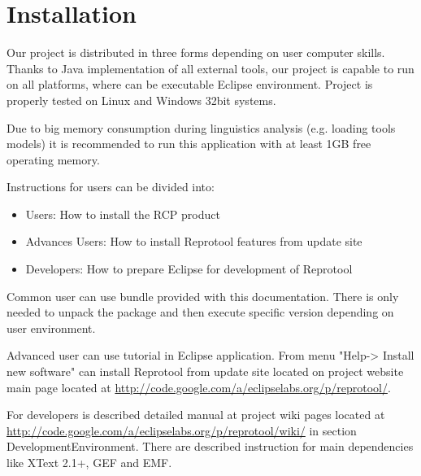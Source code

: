 \section{Installation}

Our project is distributed in three forms depending on user computer skills. Thanks to Java implementation of all external tools, our project is capable to run on all platforms, where can be executable Eclipse environment. Project is properly tested on Linux and Windows 32bit systems.

Due to big memory consumption during linguistics analysis (e.g. loading tools models) it is recommended to run this application with at least 1GB free operating memory.  

Instructions for users can be divided into:
\begin{itemize}
	\item Users: How to install the RCP product
	\item Advances Users: How to install Reprotool features from update site
	\item Developers: How to prepare Eclipse for development of Reprotool
\end{itemize}

Common user can use bundle provided with this documentation. There is only needed to unpack the package and then execute specific version depending on user environment.

Advanced user can use tutorial in Eclipse application. From menu "Help-> Install new software" can  install Reprotool from update site located on project website main page located at \href{http://code.google.com/a/eclipselabs.org/p/reprotool/}{http://code.google.com/a/eclipselabs.org/p/reprotool/}.

For developers is described detailed manual at project wiki pages  located at  \href{http://code.google.com/a/eclipselabs.org/p/reprotool/wiki/}{http://code.google.com/a/eclipselabs.org/p/reprotool/wiki/} in section DevelopmentEnvironment. There are described instruction for main dependencies like XText 2.1+, GEF and EMF.


